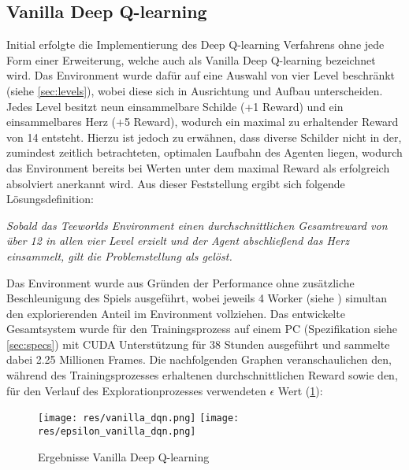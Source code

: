 \documentclass[11pt]{scrartcl}
\begin{document}

\subsection{Vanilla Deep Q-learning}
Initial erfolgte die Implementierung des Deep Q-learning Verfahrens ohne jede Form einer Erweiterung,
welche auch als Vanilla Deep Q-learning bezeichnet wird. Das Environment wurde dafür auf eine Auswahl
von vier Level beschränkt (siehe \autoref{sec:levels}), wobei diese sich in Ausrichtung und Aufbau
unterscheiden. Jedes Level besitzt neun einsammelbare Schilde (+1 Reward) und ein einsammelbares
Herz (+5 Reward), wodurch ein maximal zu erhaltender Reward von 14 entsteht. Hierzu ist jedoch zu
erwähnen, dass diverse Schilder nicht in der, zumindest zeitlich betrachteten, optimalen Laufbahn
des Agenten liegen, wodurch das Environment bereits bei Werten unter dem maximal Reward als
erfolgreich absolviert anerkannt wird. Aus dieser Feststellung ergibt sich folgende
Lösungsdefinition:

\textit{Sobald das Teeworlds Environment einen durchschnittlichen Gesamtreward von über 12 in allen
vier Level erzielt und der Agent abschließend das Herz einsammelt, gilt die Problemstellung als 
gelöst.}

Das Environment wurde aus Gründen der Performance ohne zusätzliche Beschleunigung des Spiels
ausgeführt, wobei jeweils 4 Worker (siehe ) simultan den
explorierenden Anteil im Environment vollziehen. Das entwickelte Gesamtsystem wurde für den
Trainingsprozess auf einem PC (Spezifikation siehe \autoref{sec:specs}) mit CUDA Unterstützung
für 38 Stunden ausgeführt und sammelte dabei 2.25 Millionen Frames. Die nachfolgenden Graphen
veranschaulichen den, während des Trainingsprozesses erhaltenen durchschnittlichen Reward sowie
den, für den Verlauf des Explorationprozesses verwendeten $\epsilon$ Wert (\ref{fig:vanilla-dqn}):

\begin{figure}[htp]
\centering
\texttt{[image: res/vanilla\_dqn.png]}
\texttt{[image: res/epsilon\_vanilla\_dqn.png]}
\caption{Ergebnisse Vanilla Deep Q-learning}
\label{fig:vanilla-dqn}
\end{figure}
\end{document}
